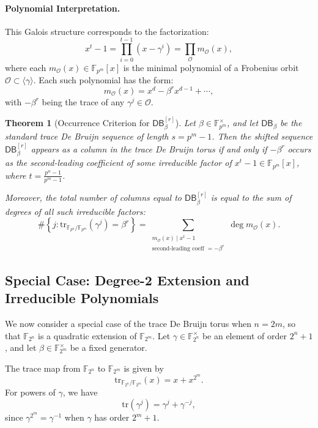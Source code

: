\documentclass{article}
\newtheorem{theorem}{Theorem}[section]
\begin{document}
\paragraph{Polynomial Interpretation.}
This Galois structure corresponds to the factorization:
\[
x^t - 1 = \prod_{i=0}^{t-1} (x - \gamma^i) = \prod_{\mathcal{O}} m_{\mathcal{O}}(x),
\]
where each \( m_{\mathcal{O}}(x) \in \mathbb{F}_{p^m}[x] \) is the minimal polynomial of a Frobenius orbit \( \mathcal{O} \subset \langle \gamma \rangle \). Each such polynomial has the form:
\[
m_{\mathcal{O}}(x) = x^d - \beta^r x^{d-1} + \cdots,
\]
with \( -\beta^r \) being the trace of any \( \gamma^j \in \mathcal{O} \).

\begin{theorem}[Occurrence Criterion for \( \mathsf{DB}_\beta^{[r]} \)]
Let \( \beta \in \mathbb{F}_{p^m}^\times \), and let \( \mathsf{DB}_\beta \) be the standard trace De Bruijn sequence of length \( s = p^m - 1 \). Then the shifted sequence \( \mathsf{DB}_\beta^{[r]} \) appears as a column in the trace De Bruijn torus if and only if \( -\beta^r \) occurs as the second-leading coefficient of some irreducible factor of \( x^t - 1 \in \mathbb{F}_{p^m}[x] \), where \( t = \frac{p^n - 1}{p^m - 1} \).

Moreover, the total number of columns equal to \( \mathsf{DB}_\beta^{[r]} \) is equal to the sum of degrees of all such irreducible factors:
\[
\#\left\{ j : \mathrm{tr}_{\mathbb{F}_{p^n}/\mathbb{F}_{p^m}}(\gamma^j) = \beta^r \right\} 
= \sum_{\substack{m_{\mathcal{O}}(x) \mid x^t - 1 \\ \text{second-leading coeff } = -\beta^r}} \deg m_{\mathcal{O}}(x).
\]
\end{theorem}

\subsection{Special Case: Degree-2 Extension and Irreducible Polynomials}

We now consider a special case of the trace De Bruijn torus when \( n = 2m \), so that \( \mathbb{F}_{2^n} \) is a quadratic extension of \( \mathbb{F}_{2^m} \). Let \( \gamma \in \mathbb{F}_{2^n}^\times \) be an element of order \( 2^n + 1 \), and let \( \beta \in \mathbb{F}_{2^m}^\times \) be a fixed generator.

The trace map from \( \mathbb{F}_{2^n} \) to \( \mathbb{F}_{2^m} \) is given by
\[
\mathrm{tr}_{\mathbb{F}_{2^n}/\mathbb{F}_{2^m}}(x) = x + x^{2^m}.
\]
For powers of \( \gamma \), we have
\[
\mathrm{tr}(\gamma^j) = \gamma^j + \gamma^{-j},
\]
since \( \gamma^{2^m} = \gamma^{-1} \) when \( \gamma \) has order \( 2^m + 1 \).
\end{document}
